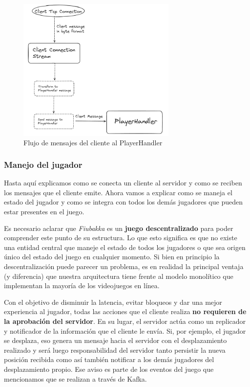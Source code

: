 \begin{figure}[htbp]
    \centering
    \includegraphics[width=0.7\textwidth]{../assets/player-handler-client-flow.png}
    \caption{Flujo de mensajes del cliente al PlayerHandler}
\end{figure}

\subsubsection{Manejo del jugador}

\noindent Hasta aquí explicamos como se conecta un cliente al servidor y como se reciben los mensajes que el cliente emite.
Ahora vamos a explicar como se maneja el estado del jugador y como se integra con todos los demás jugadores que pueden estar
presentes en el juego.

Es necesario aclarar que \textit{Fiubakka} es un \textbf{juego descentralizado} para poder comprender este punto de su estructura. Lo que esto significa es que no existe una
entidad central que maneje el estado de todos los jugadores o que sea origen único del estado del juego en cualquier momento.
Si bien en principio la descentralización puede parecer un problema, es en realidad la principal ventaja (y diferencia) que nuestra arquitectura tiene
frente al modelo monolítico que implementan la mayoría de los videojuegos en línea.

Con el objetivo de disminuir la latencia, evitar bloqueos y dar una mejor experiencia al jugador, todas las acciones que el cliente
realiza \textbf{no requieren de la aprobación del servidor}. En su lugar, el servidor actúa como un replicador y notificador de la información
que el cliente le envía. Si, por ejemplo, el jugador se desplaza, eso genera un mensaje hacia el servidor con el desplazamiento realizado y será luego
responsabilidad del servidor tanto persistir la nueva posición recibida como así también notificar a los demás jugadores del desplazamiento propio.
Ese aviso es parte de los eventos del juego que mencionamos que se realizan a través de Kafka.


